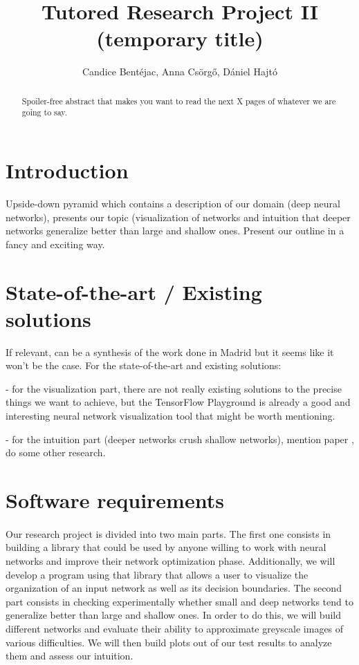 \documentclass[a4paper]{article}
\title{Tutored Research Project II (temporary title)}
\author{Candice Bentéjac, Anna Csörgő, Dániel Hajtó}
\begin{document}
\maketitle

\begin{abstract}
Spoiler-free abstract that makes you want to read the next X pages of whatever we are going to say.
\end{abstract}

\section{Introduction}
Upside-down pyramid which contains a description of our domain (deep neural networks), presents our topic (visualization of networks and intuition that deeper networks generalize better than large and shallow ones. Present our outline in a fancy and exciting way.

\section{State-of-the-art / Existing solutions}
If relevant, can be a synthesis of the work done in Madrid but it seems like it won't be the case. For the state-of-the-art and existing solutions:


- for the visualization part, there are not really existing solutions to the precise things we want to achieve, but the TensorFlow Playground is already a good and interesting neural network visualization tool that might be worth mentioning.


- for the intuition part (deeper networks crush shallow networks), mention paper \citep{Mhaskar17}, do some other research.


\section{Software requirements}
\paragraph{}Our research project is divided into two main parts. The first one consists in building a library that could be used by anyone willing to work with neural networks and improve their network optimization phase. Additionally, we will develop a program using that library that allows a user to visualize the organization of an input network as well as its decision boundaries. The second part consists in checking experimentally whether small and deep networks tend to generalize better than large and shallow ones. In order to do this, we will build different networks and evaluate their ability to approximate greyscale images of various difficulties. We will then build plots out of our test results to analyze them and assess our intuition.
\end{document}
